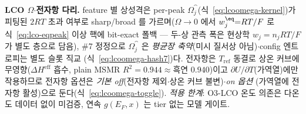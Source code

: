 \begin{keybox}
\textbf{LCO $\Omega$$\cdot$전자항 다리.} feature 별 상성격은 per-peak $\Omega_j^\cat$(식~\eqref{eq:lcoomega-kernel})가
피팅된 $2RT$ 초과 여부로 sharp/broad 를 가르며($\Omega\!\to\!0$ 에서 $w_j^{\eq}{=}RT/F$ 로 식~\eqref{eq:lco-eqpeak}
이상 핵에 bit-exact 폴백 --- 두-상 관측 폭은 현상학 $w_j{=}n_jRT/F$ 가 별도 층으로 담음), \#7 정정으로
$\Omega_j^\cat$ 은 \emph{평균장 축약}(미시 질서상 아님)$\cdot$config 엔트로피는 별도 슬롯 직교
(식~\eqref{eq:lcoomega-hash7})다. 전자항은 $T_\mathrm{ref}$ 동결로 상온 커브에 무영향($\Delta H^\mathrm{eff}$
흡수, plain MSMR $R^2{=}0.944\!\approx\!$흑연 $0.940$)이고 $\partial U/\partial T$(가역열)에만 작용하므로
전자항 옵션은 \emph{기본 off}(전자항 제외$\cdot$상온 커브 불변)$\cdot$\emph{on 옵션}
(가역열에 전자항 활성)으로 둔다(식~\eqref{eq:lcoomega-toggle}).
\emph{적용 한계}: O3-LCO 온도 의존은 다온도 데이터 없이 미검증, 연속 $g(E_F,x)$ 는 tier 없는 모델 게이트.
\end{keybox}

